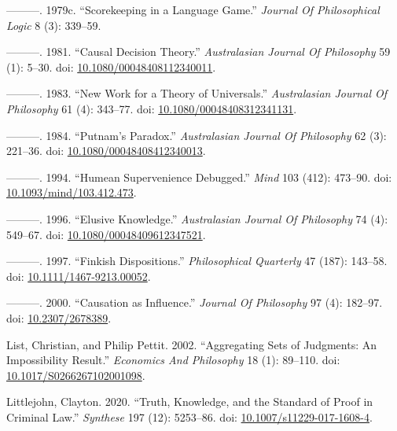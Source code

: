 \documentclass[
  10pt,
  letterpaper,
  DIV=11,
  numbers=noendperiod,
  twoside]{scrartcl}
\newlength{\cslhangindent}
\newenvironment{CSLReferences}[2] %
 {\begin{list}{}{%
  \setlength{\itemindent}{0pt}
  \setlength{\leftmargin}{0pt}
  \setlength{\parsep}{0pt}
  \ifodd #1
   \setlength{\leftmargin}{\cslhangindent}
   \setlength{\itemindent}{-1\cslhangindent}
  \fi
  \setlength{\itemsep}{#2\baselineskip}}}
 {\end{list}}
\begin{document}
\begin{CSLReferences}{1}{0}
---------. 1979c. {``Scorekeeping in a Language Game.''} \emph{Journal
Of Philosophical Logic} 8 (3): 339--59.

---------. 1981. {``Causal Decision Theory.''} \emph{Australasian
Journal Of Philosophy} 59 (1): 5--30. doi:
\href{https://doi.org/10.1080/00048408112340011}{10.1080/00048408112340011}.

---------. 1983. {``New Work for a Theory of Universals.''}
\emph{Australasian Journal Of Philosophy} 61 (4): 343--77. doi:
\href{https://doi.org/10.1080/00048408312341131}{10.1080/00048408312341131}.

---------. 1984. {``Putnam's Paradox.''} \emph{Australasian Journal Of
Philosophy} 62 (3): 221--36. doi:
\href{https://doi.org/10.1080/00048408412340013}{10.1080/00048408412340013}.

---------. 1994. {``Humean Supervenience Debugged.''} \emph{Mind} 103
(412): 473--90. doi:
\href{https://doi.org/10.1093/mind/103.412.473}{10.1093/mind/103.412.473}.

---------. 1996. {``Elusive Knowledge.''} \emph{Australasian Journal Of
Philosophy} 74 (4): 549--67. doi:
\href{https://doi.org/10.1080/00048409612347521}{10.1080/00048409612347521}.

---------. 1997. {``Finkish Dispositions.''} \emph{Philosophical
Quarterly} 47 (187): 143--58. doi:
\href{https://doi.org/10.1111/1467-9213.00052}{10.1111/1467-9213.00052}.

---------. 2000. {``Causation as Influence.''} \emph{Journal Of
Philosophy} 97 (4): 182--97. doi:
\href{https://doi.org/10.2307/2678389}{10.2307/2678389}.

List, Christian, and Philip Pettit. 2002. {``Aggregating Sets of
Judgments: An Impossibility Result.''} \emph{Economics And Philosophy}
18 (1): 89--110. doi:
\href{https://doi.org/10.1017/S0266267102001098}{10.1017/S0266267102001098}.

Littlejohn, Clayton. 2020. {``Truth, Knowledge, and the Standard of
Proof in Criminal Law.''} \emph{Synthese} 197 (12): 5253--86. doi:
\href{https://doi.org/10.1007/s11229-017-1608-4}{10.1007/s11229-017-1608-4}.


\end{CSLReferences}
\end{document}
